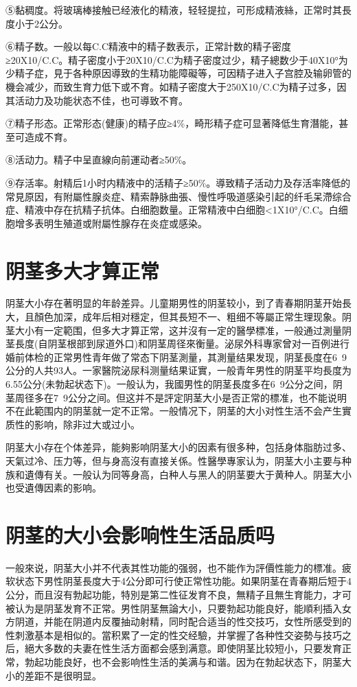 \documentclass[12pt,UTF8]{ctexbook}
\begin{document}
⑤黏稠度。将玻璃棒接触已经液化的精液，轻轻提拉，可形成精液絲，正常时其長度小于2公分。

⑥精子数。一般以每C.C精液中的精子数表示，正常計数的精子密度≥20X10/C.C。精子密度小于20X10/C.C为精子密度过少，精子總数少于40X10°为少精子症，見于各种原因導致的生精功能障礙等，可因精子进入子宫腔及输卵管的機会减少，而致生育力低下或不育。如精子密度大于250X10/C.C为精子过多，因其活动力及功能状态不佳，也可導致不育。

⑦精子形态。正常形态(健康)的精子应≥4\%，畸形精子症可显著降低生育潛能，甚至可造成不育。

⑧活动力。精子中呈直線向前運动者≥50\%。

⑨存活率。射精后1小时内精液中的活精子≥50\%。導致精子活动力及存活率降低的常見原因，有附屬性腺炎症、精索静脉曲張、慢性呼吸道感染引起的纤毛呆滯综合症、精液中存在抗精子抗体。白细胞数量。正常精液中白细胞<1X10°/C.C。白细胞增多表明生殖道或附屬性腺存在炎症或感染。

\section{阴茎多大才算正常}

阴茎大小存在著明显的年龄差异。儿童期男性的阴茎较小，到了青春期阴茎开始長大，且顏色加深，成年后相对穩定，但其長短不一、粗细不等屬正常生理现象。阴茎大小有一定範围，但多大才算正常，这并沒有一定的醫學標准，一般通过測量阴茎長度(自阴茎根部到尿道外口)和阴茎周径來衡量。泌尿外科專家曾对一百例进行婚前体检的正常男性青年做了常态下阴茎測量，其測量结果发现，阴茎長度在6~9公分的人共93人。一家醫院泌尿科测量结果证實，一般青年男性的阴茎平均長度为6.55公分(未勃起状态下)。一般认为，我國男性的阴茎長度多在6~9公分之间，阴茎周径多在7~9公分之间。但这并不是評定阴茎大小是否正常的標准，也不能说明不在此範围内的阴茎就一定不正常。一般情况下，阴茎的大小对性生活不会产生實质性的影响，除非过大或过小。

阴茎大小存在个体差异，能夠影响阴茎大小的因素有很多种，包括身体脂肪过多、天氣过冷、压力等，但与身高沒有直接关係。性醫學專家认为，阴茎大小主要与种族和遺傳有关。一般认为同等身高，白种人与黑人的阴茎要大于黄种人。阴茎大小也受遺傳因素的影响。

\section{阴茎的大小会影响性生活品质吗}

一般來说，阴茎大小并不代表其性功能的强弱，也不能作为評價性能力的標准。疲软状态下男性阴茎長度大于4公分即可行使正常性功能。如果阴茎在青春期后短于4公分，而且沒有勃起功能，特別是第二性征发育不良，無精子且無生育能力，才可被认为是阴茎发育不正常。男性阴茎無論大小，只要勃起功能良好，能順利插入女方阴道，并能在阴道内反覆抽动射精，同时配合适当的性交技巧，女性所感受到的性刺激基本是相似的。當积累了一定的性交经驗，并掌握了各种性交姿勢与技巧之后，絕大多数的夫妻在性生活方面都会感到满意。即使阴茎比较短小，只要发育正常，勃起功能良好，也不会影响性生活的美满与和谐。因为在勃起状态下，阴茎大小的差距不是很明显。
\end{document}
